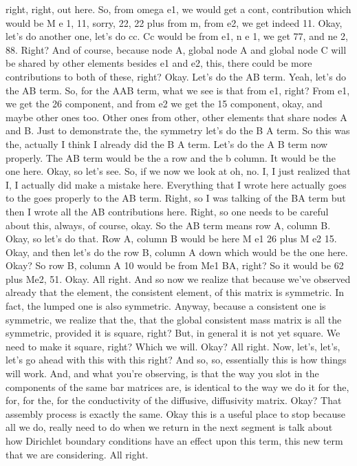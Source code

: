 \documentclass[10pt]{article}
\begin{document}
right, right, out here. So, from omega e1, we would get a cont, contribution which would be M e 1, 11, sorry, 22,  22 plus from m, from e2, we get indeed 11. Okay, let's do another one, let's do cc. Cc would be from e1, n e 1, we get 77, and ne 2, 88. Right? And of course, because node A, global node A and global node C will be shared by other elements besides e1 and e2, this, there could be more contributions to both of these, right? Okay. Let's do the AB term. Yeah, let's do the AB term. So, for the AAB term, what we see is that from e1, right? From e1, we get the 26 component, and from e2 we get the 15 component, okay, and maybe other ones too. Other ones from other, other elements that share nodes A and B. Just to demonstrate the, the symmetry let's do the B A term. So this was the, actually I think I already did the B A term. Let's do the A B term now properly. The AB term would be the a row and the b column. It would be the one here. Okay, so let's see. So, if we now we look at oh, no. I, I just realized that I, I actually did make a mistake here. Everything that I wrote here actually goes to the goes properly to the AB term. Right, so I was talking of the BA term but then I wrote all the AB contributions here. Right, so one needs to be careful about this, always, of course, okay. So the AB term means row A, column B. Okay, so let's do that. Row A, column B would be here M e1 26 plus M e2 15. Okay, and then let's do the row B, column A down which would be the one here. Okay? So row B, column A 10 would be from Me1 BA, right? So it would be 62 plus Me2, 51. Okay. All right. And so now we realize that because we've observed already that the element, the consistent element, of this matrix is symmetric. In fact, the lumped one is also symmetric. Anyway, because a consistent one is symmetric, we realize that the, that the global consistent mass matrix is all the symmetric, provided it is square, right? But, in general it is not yet square. We need to make it square, right? Which we will. Okay? All right. Now, let's, let's, let's go ahead with this with this right? And so, so, essentially this is how things will work. And, and what you're observing, is that the way you slot in the components of the same bar matrices are, is identical to the way we do it for the, for, for the, for the conductivity of the diffusive, diffusivity matrix. Okay? That assembly process is exactly the same. Okay this is a useful place to stop because all we do, really need to do when we return in the next segment is talk about how Dirichlet boundary conditions have an effect upon this term, this new term that we are considering. All right.
\end{document}
